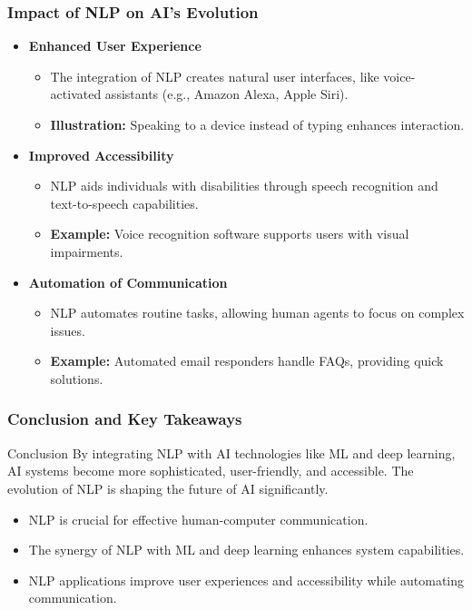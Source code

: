 \documentclass[aspectratio=169]{beamer}
\begin{document}
\begin{frame}[fragile]
    \frametitle{Impact of NLP on AI's Evolution}
    \begin{itemize}
        \item \textbf{Enhanced User Experience}
            \begin{itemize}
                \item The integration of NLP creates natural user interfaces, like voice-activated assistants (e.g., Amazon Alexa, Apple Siri).
                \item \textbf{Illustration:} Speaking to a device instead of typing enhances interaction.
            \end{itemize}
        \item \textbf{Improved Accessibility}
            \begin{itemize}
                \item NLP aids individuals with disabilities through speech recognition and text-to-speech capabilities.
                \item \textbf{Example:} Voice recognition software supports users with visual impairments.
            \end{itemize}
        \item \textbf{Automation of Communication}
            \begin{itemize}
                \item NLP automates routine tasks, allowing human agents to focus on complex issues.
                \item \textbf{Example:} Automated email responders handle FAQs, providing quick solutions.
            \end{itemize}
    \end{itemize}
\end{frame}

\begin{frame}[fragile]
    \frametitle{Conclusion and Key Takeaways}
    \begin{block}{Conclusion}
        By integrating NLP with AI technologies like ML and deep learning, AI systems become more sophisticated, user-friendly, and accessible. The evolution of NLP is shaping the future of AI significantly.
    \end{block}
    
    \begin{itemize}
        \item NLP is crucial for effective human-computer communication.
        \item The synergy of NLP with ML and deep learning enhances system capabilities.
        \item NLP applications improve user experiences and accessibility while automating communication.
    \end{itemize}
\end{frame}
\end{document}
